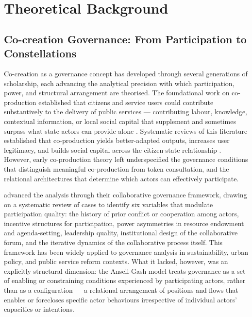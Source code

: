 \documentclass[review,12pt]{elsarticle}
\begin{document}
\section{Theoretical Background}
\label{sec:theory}

\subsection{Co-creation Governance: From Participation to Constellations}

Co-creation as a governance concept has developed through several generations of scholarship, each advancing the analytical precision with which participation, power, and structural arrangement are theorised. The foundational work on co-production established that citizens and service users could contribute substantively to the delivery of public services --- contributing labour, knowledge, contextual information, or local social capital that supplement and sometimes surpass what state actors can provide alone \citep{ostrom1996crossing, bovaird2007beyond}. Systematic reviews of this literature established that co-production yields better-adapted outputs, increases user legitimacy, and builds social capital across the citizen-state relationship \citep{voorberg2015systematic}. However, early co-production theory left underspecified the governance conditions that distinguish meaningful co-production from token consultation, and the relational architectures that determine which actors can effectively participate.

\citet{ansell2008collaborative} advanced the analysis through their collaborative governance framework, drawing on a systematic review of cases to identify six variables that modulate participation quality: the history of prior conflict or cooperation among actors, incentive structures for participation, power asymmetries in resource endowment and agenda-setting, leadership quality, institutional design of the collaborative forum, and the iterative dynamics of the collaborative process itself. This framework has been widely applied to governance analysis in sustainability, urban policy, and public service reform contexts. What it lacked, however, was an explicitly structural dimension: the Ansell-Gash model treats governance as a set of enabling or constraining conditions experienced by participating actors, rather than as a configuration --- a relational arrangement of positions and flows that enables or forecloses specific actor behaviours irrespective of individual actors' capacities or intentions.
\end{document}
